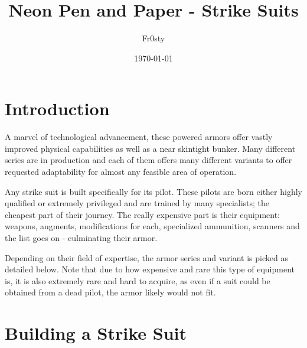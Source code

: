\documentclass[12pt,a4paper,openany]{book}
\title{Neon Pen and Paper - Strike Suits}
\author{Fr0sty}
\date{\today}
\begin{document}
	\maketitle
	\tableofcontents
	
	\chapter{Introduction}
	A marvel of technological advancement, these powered armors offer vastly improved physical capabilities as well as a near skintight bunker. Many different series are in production and each of them offers many different variants to offer requested adaptability for almost any feasible area of operation.\par
	Any strike suit is built specifically for its pilot. These pilots are born either highly qualified or extremely privileged and are trained by many specialists; the cheapest part of their journey. The really expensive part is their equipment: weapons, augments, modifications for each, specialized ammunition, scanners and the list goes on - culminating their armor.\par
	Depending on their field of expertise, the armor series and variant is picked as detailed below. Note that due to how expensive and rare this type of equipment is, it is also extremely rare and hard to acquire, as even if a suit could be obtained from a dead pilot, the armor likely would not fit.
	
	\chapter{Building a Strike Suit}
\end{document}
